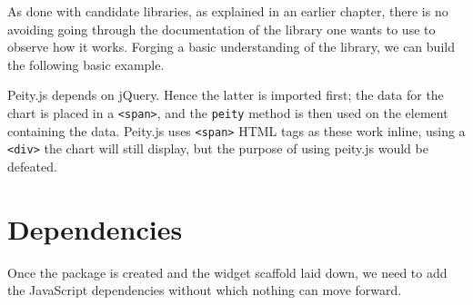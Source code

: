 \documentclass[10pt,]{krantz}
\makeatletter
\newenvironment{Shaded}{\begin{snugshade}}{\end{snugshade}}
\newcommand{\AttributeTok}[1]{\textcolor[rgb]{0.61,0.61,0.61}{#1}}
\newcommand{\CommentTok}[1]{\textcolor[rgb]{0.37,0.37,0.37}{\textit{#1}}}
\newcommand{\DataTypeTok}[1]{\textcolor[rgb]{0.27,0.27,0.27}{#1}}
\newcommand{\KeywordTok}[1]{\textcolor[rgb]{0.27,0.27,0.27}{\textbf{#1}}}
\newcommand{\NormalTok}[1]{#1}
\newcommand{\OperatorTok}[1]{\textcolor[rgb]{0.43,0.43,0.43}{\textbf{#1}}}
\newcommand{\OtherTok}[1]{\textcolor[rgb]{0.37,0.37,0.37}{#1}}
\newcommand{\StringTok}[1]{\textcolor[rgb]{0.5,0.5,0.5}{#1}}
\newenvironment{kframe}{%
\medskip{}
\setlength{\fboxsep}{.8em}
 \def\at@end@of@kframe{}%
 \ifinner\ifhmode%
  \def\at@end@of@kframe{\end{minipage}}%
  \begin{minipage}{\columnwidth}%
 \fi\fi%
 \def\FrameCommand##1{\hskip\@totalleftmargin \hskip-\fboxsep
 \colorbox{shadecolor}{##1}\hskip-\fboxsep
     \hskip-\linewidth \hskip-\@totalleftmargin \hskip\columnwidth}%
 \MakeFramed {\advance\hsize-\width
   \@totalleftmargin\z@ \linewidth\hsize
   \@setminipage}}%
 {\par\unskip\endMakeFramed%
 \at@end@of@kframe}
\renewenvironment{Shaded}{\begin{kframe}}{\end{kframe}}
\makeatother
\begin{document}
As done with candidate libraries, as explained in an earlier chapter, there is no avoiding going through the documentation of the library one wants to use to observe how it works. Forging a basic understanding of the library, we can build the following basic example.

\begin{Shaded}
\end{Shaded}

Peity.js depends on jQuery. Hence the latter is imported first; the data for the chart is placed in a \texttt{\textless{}span\textgreater{}}, and the \texttt{peity} method is then used on the element containing the data. Peity.js uses \texttt{\textless{}span\textgreater{}} HTML tags as these work inline, using a \texttt{\textless{}div\textgreater{}} the chart will still display, but the purpose of using peity.js would be defeated.

\hypertarget{widgets-realistic-deps}{%
\section{Dependencies}\label{widgets-realistic-deps}}

Once the package is created and the widget scaffold laid down, we need to add the JavaScript dependencies without which nothing can move forward.
\end{document}
